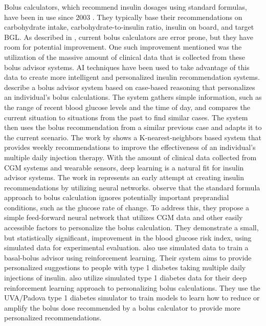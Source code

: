 \documentclass[journal,article,submit,moreauthors,pdftex]{Definitions/mdpi}
\begin{document}
Bolus calculators, which recommend insulin dosages using standard formulas, have been in use since 2003 \cite{gross:calculator}. They typically base their recommendations on carbohydrate intake, carbohydrate-to-insulin ratio, insulin on board, and target BGL.  As described in \citet{walsh:jdst18}, current bolus calculators are error prone, but they have room for potential improvement. One such improvement mentioned was the utilization of the massive amount of clinical data that is collected from these bolus advisor systems. AI techniques have been used to take advantage of this data to create more intelligent and personalized insulin recommendation systems. \citet{pesl:case_based} describe a bolus advisor system based on case-based reasoning that personalizes an individual's bolus calculations. The system gathers simple information, such as the range of recent blood glucose levels and the time of day, and compares the current situation to situations from the past to find similar cases. The system then uses the bolus recommendation from a similar previous case and adapts it to the current scenario. The work by \citet{tyler:knn} shows a K-nearest-neighbors based system that provides weekly recommendations to improve the effectiveness of an individual's multiple daily injection therapy. With the amount of clinical data collected from CGM systems and wearable sensors, deep learning is a natural fit for insulin advisor systems. The work in \citet{stavroula:dtt} represents an early attempt at creating insulin recommendations by utilizing neural networks. \citet{cappon:jdst18} observe that the standard formula approach to bolus calculation ignores potentially important preprandial conditions, such as the glucose rate of change. To address this, they propose a simple feed-forward neural network that utilizes CGM data and other easily accessible factors to personalize the bolus calculation. They demonstrate a small, but statistically significant, improvement in the blood glucose risk index, using simulated data for experimental evaluation. \citet{sun:jbhi19} also use simulated data to train a basal-bolus advisor using reinforcement learning. Their system aims to provide personalized suggestions to people with type 1 diabetes taking multiple daily injections of insulin. \citet{zhu:bolus_drl} also utilize simulated type 1 diabetes data for their deep reinforcement learning approach to personalizing bolus calculations. They use the UVA/Padova type 1 diabetes simulator \cite{dalla_man:simulator} to train models to learn how to reduce or amplify the bolus dose recommended by a bolus calculator to provide more personalized recommendations.
\end{document}
